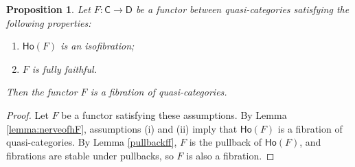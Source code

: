 \documentclass{proc-l}
\newcommand{\ho}[1]{\mathsf{Ho}(#1)}
\theoremstyle{plain}
\newtheorem{proposition}[{theorem}]{Proposition}
\theoremstyle{definition}
\theoremstyle{remark}
\begin{document}
\begin{proposition}%
\label{Proposition:B.4}\label{prop:fibrationff}
Let $F:\mathsf{C}\rightarrow\mathsf{D}$ be a functor between quasi-categories satisfying the following properties:
\begin{enumerate}[label=(\roman*),start=1]
\item $\ho{F}$ is an isofibration;

\item $F$ is fully faithful.

\end{enumerate}
Then the functor $F$ is a fibration of quasi-categories.
\end{proposition}
\begin{proof}
Let $F$ be a functor satisfying these assumptions. By Lemma \ref{lemma:nerveofhF}, assumptions (i) and (ii) imply that $\ho{F}$ is a fibration of quasi-categories. By Lemma \ref{pullbackff}, $F$ is the pullback of $\ho{F}$, and fibrations are stable under pullbacks, so $F$ is also a fibration.
\end{proof}
\end{document}
